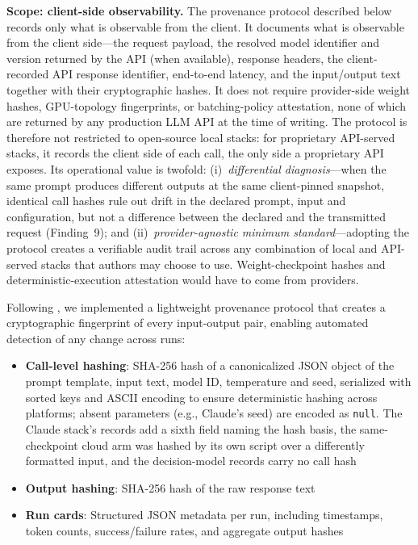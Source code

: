 \documentclass[preprint,review,12pt,authoryear]{elsarticle}
\begin{document}
\textbf{Scope: client-side observability.}
The provenance protocol described below records only what is observable from the client.
It documents what is observable from the client side---the request payload, the resolved model identifier and version returned by the API (when available), response headers, the client-recorded API response identifier, end-to-end latency, and the input/output text together with their cryptographic hashes.
It does not require provider-side weight hashes, GPU-topology fingerprints, or batching-policy attestation, none of which are returned by any production LLM API at the time of writing.
The protocol is therefore not restricted to open-source local stacks: for proprietary API-served stacks, it records the client side of each call, the only side a proprietary API exposes.
Its operational value is twofold: (i)~\emph{differential diagnosis}---when the same prompt produces different outputs at the same client-pinned snapshot, identical call hashes rule out drift in the declared prompt, input and configuration, but not a difference between the declared and the transmitted request (Finding~9); and (ii)~\emph{provider-agnostic minimum standard}---adopting the protocol creates a verifiable audit trail across any combination of local and API-served stacks that authors may choose to use.
Weight-checkpoint hashes and deterministic-execution attestation would have to come from providers.

Following \citet{rover2026jair}, we implemented a lightweight provenance protocol that creates a cryptographic fingerprint of every input-output pair, enabling automated detection of any change across runs:
\begin{itemize}
  \item \textbf{Call-level hashing}: SHA-256 hash of a canonicalized JSON object of the prompt template, input text, model ID, temperature and seed, serialized with sorted keys and ASCII encoding to ensure deterministic hashing across platforms; absent parameters (e.g., Claude's seed) are encoded as \texttt{null}. The Claude stack's records add a sixth field naming the hash basis, the same-checkpoint cloud arm was hashed by its own script over a differently formatted input, and the decision-model records carry no call hash
  \item \textbf{Output hashing}: SHA-256 hash of the raw response text
  \item \textbf{Run cards}: Structured JSON metadata per run, including timestamps, token counts, success/failure rates, and aggregate output hashes
\end{itemize}
\end{document}
